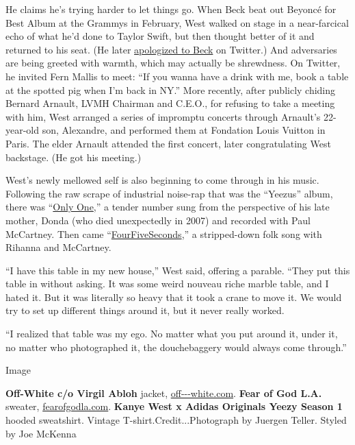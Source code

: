 He claims he's trying harder to let things go. When Beck beat out
Beyoncé for Best Album at the Grammys in February, West walked on stage
in a near-farcical echo of what he'd done to Taylor Swift, but then
thought better of it and returned to his seat. (He later
\href{http://www.nytimes3xbfgragh.onion/aponline/2015/02/26/us/ap-us-people-kanye-west.html}{apologized
to Beck} on Twitter.) And adversaries are being greeted with warmth,
which may actually be shrewdness. On Twitter, he invited Fern Mallis to
meet: ``If you wanna have a drink with me, book a table at the spotted
pig when I'm back in NY.'' More recently, after publicly chiding Bernard
Arnault, LVMH Chairman and C.E.O., for refusing to take a meeting with
him, West arranged a series of impromptu concerts through Arnault's
22-year-old son, Alexandre, and performed them at Fondation Louis
Vuitton in Paris. The elder Arnault attended the first concert, later
congratulating West backstage. (He got his meeting.)

West's newly mellowed self is also beginning to come through in his
music. Following the raw scrape of industrial noise-rap that was the
``Yeezus'' album, there was
``\href{https://www.youtube.com/watch?v=WibQR0tQ0P8}{Only One},'' a
tender number sung from the perspective of his late mother, Donda (who
died unexpectedly in 2007) and recorded with Paul McCartney. Then came
``\href{https://www.youtube.com/watch?v=kt0g4dWxEBo}{FourFiveSeconds},''
a stripped-down folk song with Rihanna and McCartney.

``I have this table in my new house,'' West said, offering a parable.
``They put this table in without asking. It was some weird nouveau riche
marble table, and I hated it. But it was literally so heavy that it took
a crane to move it. We would try to set up different things around it,
but it never really worked.

``I realized that table was my ego. No matter what you put around it,
under it, no matter who photographed it, the douchebaggery would always
come through.''

Image

\textbf{Off-White c/o Virgil Abloh} jacket,
\href{http://www.off---white.com}{off-\/-\/-white.com}. \textbf{Fear of
God L.A.} sweater, \href{http://www.fearofgodla.com}{fearofgodla.com}.
\textbf{Kanye West x Adidas Originals Yeezy Season 1} hooded sweatshirt.
Vintage T-shirt.Credit...Photograph by Juergen Teller. Styled by Joe
McKenna

